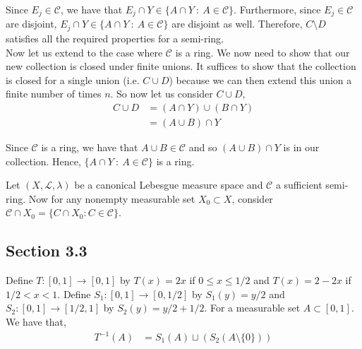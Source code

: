 \documentclass[12pt]{article}
\newenvironment{problem}[2][Problem]{\begin{trivlist}
\item[\hskip \labelsep {\bfseries #1}\hskip \labelsep {\bfseries #2.}]}{\end{trivlist}}
\begin{document}
Since $E_j \in \mathcal{C}$, we have that $E_j \cap Y \in \{A \cap Y \ : \ A \in \mathcal{C} \}$. Furthermore, since $E_j \in \mathcal{C}$ are disjoint, $E_j \cap Y \in \{A \cap Y \ : \ A \in \mathcal{C} \}$ are disjoint as well. Therefore, $C \setminus D$ satisfies all the required properties for a semi-ring.\\

Now let us extend to the case where $\mathcal{C}$ is a ring. We now need to show that our new collection is closed under finite unions. It suffices to show that the collection is closed for a single union (i.e. $C \cup D$) because we can then extend this union a finite number of times $n$. So now let us consider $C \cup D$,
\begin{align*}
C \cup D &= (A \cap Y) \cup (B \cap Y)\\
&= (A \cup B) \cap Y
\end{align*}

Since $\mathcal{C}$ is a ring, we have that $A \cup B \in \mathcal{C}$ and so $(A \cup B) \cap Y$ is in our collection. Hence, $\{A \cap Y \ : \ A \in \mathcal{C} \}$ is a ring.

\begin{problem}{2}
\end{problem}

Let $(X, \mathcal{L}, \lambda)$ be a canonical Lebesgue measure space and $\mathcal{C}$ a sufficient semi-ring. Now for any nonempty measurable set $X_0 \subset X$, consider $\mathcal{C} \cap X_0 = \{C \cap X_0 : C \in \mathcal{C}\}$.

\begin{problem}{6}
\end{problem}

\begin{problem}{7}
\end{problem}

\subsection{Section 3.3}

\begin{problem}{1}
\end{problem}

Define $T: [0, 1] \to [0,1]$ by $T(x) = 2x$ if $0 \leq x \leq 1/2$ and $T(x) = 2 - 2x$ if $1/2 < x < 1$. Define $S_1: [0, 1] \to [0, 1/2]$ by $S_1(y) = y/2$ and $S_2: [0, 1] \to [1/2, 1]$ by $S_2(y) = y/2 + 1/2$. For a measurable set $A \subset [0, 1]$. We have that,
\begin{align*}
T^{-1}(A) &= S_1(A) \sqcup (S_2(A \setminus \{0\}))
\end{align*}
\end{document}
